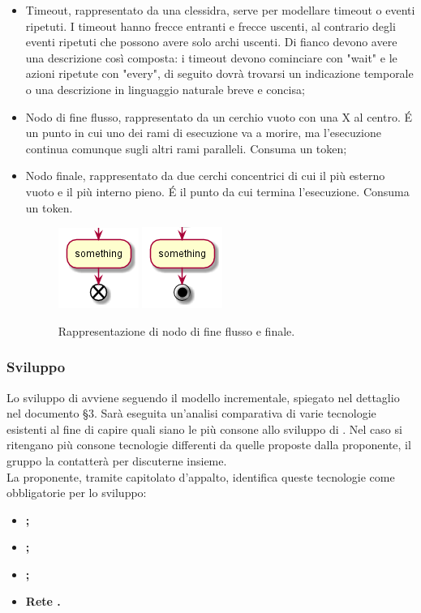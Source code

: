 \documentclass[NormeDiProgetto.tex]{subfiles}
\begin{document}
\begin{itemize}
\item Timeout, rappresentato da una clessidra, serve per modellare timeout o eventi ripetuti. I timeout hanno frecce entranti e frecce uscenti, al contrario degli eventi ripetuti che possono avere solo archi uscenti. Di fianco devono avere una descrizione così composta: i timeout devono cominciare con "wait" e le azioni ripetute con "every", di seguito dovrà trovarsi un indicazione temporale o una descrizione in linguaggio naturale breve e concisa;
\item Nodo di fine flusso, rappresentato da un cerchio vuoto con una X al centro. \'E
un punto in cui uno dei rami di esecuzione va a morire, ma l'esecuzione continua comunque sugli altri rami paralleli. Consuma un token;
\item Nodo finale, rappresentato da due cerchi concentrici di cui il più esterno vuoto e il più interno pieno. \'E il punto da cui termina l'esecuzione. Consuma un token.
\begin{figure}[h]
	\centering
	\includegraphics[width=0.2\linewidth]{progettazione/endact}
	\quad
	\includegraphics[width=0.2\linewidth]{progettazione/stopact}
	\label{fig:endact}
	\caption{Rappresentazione di nodo di fine flusso e finale.}
\end{figure}


\end{itemize}

\subsubsection{Sviluppo}
Lo sviluppo di \progetto avviene seguendo il modello incrementale, spiegato nel dettaglio nel documento \pdp \S 3. Sarà eseguita un'analisi comparativa di varie tecnologie esistenti al fine di capire quali siano le più consone allo sviluppo di \progetto. Nel caso si ritengano più consone tecnologie differenti da quelle proposte dalla proponente, il gruppo \gruppo la contatterà per discuterne insieme.\\
La proponente, tramite capitolato d'appalto, identifica queste tecnologie come obbligatorie per lo sviluppo:\\
\begin{itemize}
	\item \textbf{;}
	\item \textbf{;}
	\item \textbf{;}
	\item \textbf{Rete .}
\end{itemize}
\end{document}
